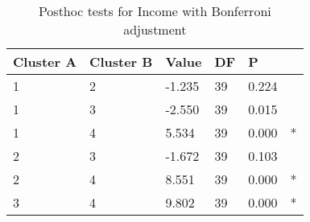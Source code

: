 \begin{table}[h]
\caption{Posthoc tests for Income with Bonferroni adjustment}
\label{tab:posthoc_Income}
\begin{tabular}{llllll}
\toprule
Cluster A & Cluster B & Value & DF & P &   \\
\midrule
1 & 2 & -1.235 & 39 & 0.224 &   \\
1 & 3 & -2.550 & 39 & 0.015 &   \\
1 & 4 & 5.534 & 39 & 0.000 & * \\
2 & 3 & -1.672 & 39 & 0.103 &   \\
2 & 4 & 8.551 & 39 & 0.000 & * \\
3 & 4 & 9.802 & 39 & 0.000 & * \\
\bottomrule
\end{tabular}
\end{table}
